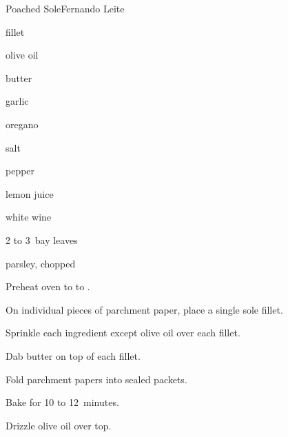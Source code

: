 \begin{recipe}{Poached Sole}{Fernando Leite}{}

\begin{ingredients}
\item {} fillet 
\item olive oil
\item butter
\item garlic
\item oregano
\item salt
\item pepper
\item lemon juice
\item white wine
\item 2 to 3~bay leaves
\item parsley, chopped 
\end{ingredients}

\begin{directions}
\item Preheat oven to  to .
\item On individual pieces of parchment paper, place a single sole fillet.
\item Sprinkle each ingredient except olive oil over each fillet.
\item Dab butter on top of each fillet.
\item Fold parchment papers into sealed packets.
\item Bake for 10 to 12~minutes.
\item Drizzle olive oil over top.
\end{directions}

\end{recipe}
